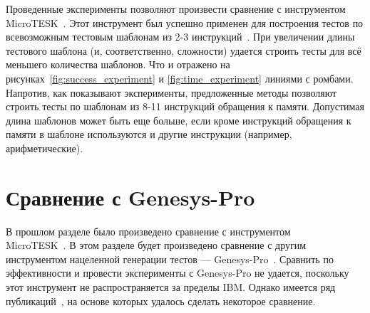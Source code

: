 Проведенные эксперименты позволяют произвести сравнение с инструментом
MicroTESK~\cite{MicroTESK}. Этот инструмент был успешно применен для построения
тестов по всевозможным тестовым шаблонам из 2-3 инструкций~\cite{vorobyev}. При
увеличении длины тестового шаблона (и, соответственно, сложности) удается
строить тесты для всё меньшего количества шаблонов. Что и отражено на
рисунках~\ref{fig:success_experiment} и \ref{fig:time_experiment} линиями с
ромбами. Напротив, как показывают эксперименты, предложенные методы позволяют
строить тесты по шаблонам из 8-11 инструкций обращения к памяти. Допустимая
длина шаблонов может быть еще больше, если кроме инструкций обращения к памяти в
шаблоне используются и другие инструкции (например, арифметические).

\section{Сравнение с Genesys-Pro}

В прошлом разделе было произведено сравнение с инструментом\\
MicroTESK~\cite{MicroTESK}. В этом разделе будет произведено сравнение с другим
инструментом нацеленной генерации тестов --- Genesys-Pro~\cite{GenesysPro}. Сравнить
по эффективности и провести эксперименты с Genesys-Pro не удается, поскольку
этот инструмент не распространяется за пределы IBM. Однако имеется ряд
публикаций~\cite{GenesysPro2004Innovations, GenesysSolver}, на основе которых удалось сделать некоторое сравнение.

